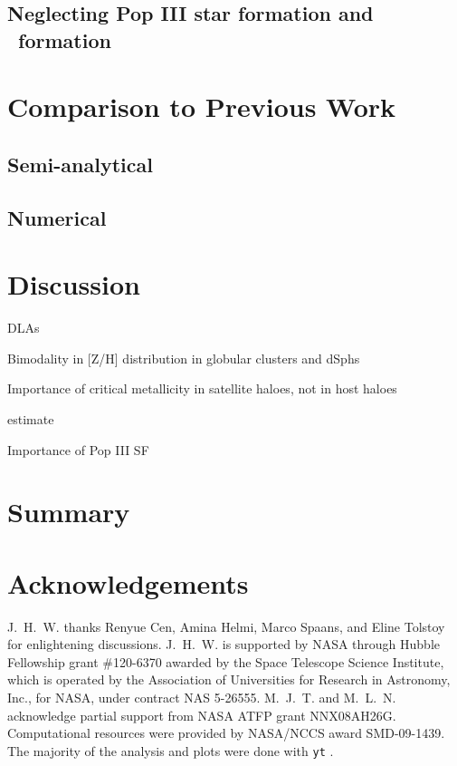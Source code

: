 \documentclass[useAMS,usenatbib]{mn2e}
\begin{document}
\subsection{Neglecting Pop III star formation and \hh~formation}

\section{Comparison to Previous Work}
\label{sec:compare}

\subsection{Semi-analytical}

\subsection{Numerical}

\section{Discussion}
\label{sec:discuss}

\li DLAs

\li Bimodality in [Z/H] distribution in globular clusters and dSphs

\li Importance of critical metallicity in satellite haloes, not in host
haloes

\li [$\alpha$/Fe] estimate

\li Importance of Pop III SF

\section{Summary}
\label{sec:summary}

\section*{Acknowledgements}

J.~H.~W. thanks Renyue Cen, Amina Helmi, Marco Spaans, and Eline
Tolstoy for enlightening discussions.  J.~H.~W. is supported by NASA
through Hubble Fellowship grant \#120-6370 awarded by the Space
Telescope Science Institute, which is operated by the Association of
Universities for Research in Astronomy, Inc., for NASA, under contract
NAS 5-26555.  M.~J.~T. and M.~L.~N. acknowledge partial support from
NASA ATFP grant NNX08AH26G.  Computational resources were provided by
NASA/NCCS award SMD-09-1439.  The majority of the analysis and plots
were done with \texttt{yt} \citep{yt_full_paper}.


\bsp
\label{lastpage}
\end{document}
